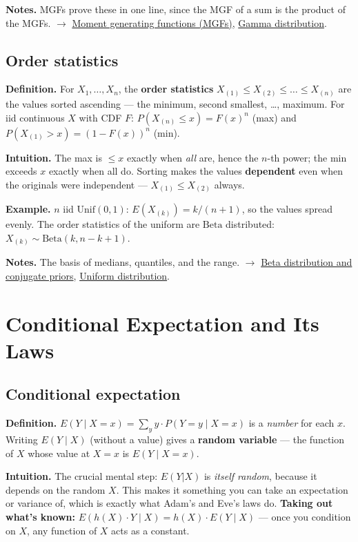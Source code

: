 \documentclass[11pt,a4paper]{article}
\begin{document}
\textbf{Notes.} MGFs prove these in one line, since the MGF of a sum is the product of the MGFs. $\to$ \hyperref[sec:moment-generating-functions-mgfs]{Moment generating functions (MGFs)}, \hyperref[sec:gamma-distribution]{Gamma distribution}.

\subsection{Order statistics}\label{sec:order-statistics}

\textbf{Definition.} For $X_{1}, \ldots , X_{n}$, the \textbf{order statistics} $X_{(1)} \leq  X_{(2)} \leq  \ldots  \leq  X_{(n)}$ are the values sorted ascending --- the minimum, second smallest, \ldots{}, maximum. For iid continuous $X$ with CDF $F$:
$P(X_{(n)} \leq  x) = F(x)^{n}$ (max) and $P(X_{(1)} > x) = (1 - F(x))^{n}$ (min).

\textbf{Intuition.} The max is $\leq  x$ exactly when \textit{all} are, hence the $n$-th power; the min exceeds $x$ exactly when all do. Sorting makes the values \textbf{dependent} even when the originals were independent --- $X_{(1)} \leq  X_{(2)}$ always.

\textbf{Example.} $n$ iid $\mathrm{Unif}(0,1)$: $E(X_{(k)}) = k/(n+1)$, so the values spread evenly. The order statistics of the uniform are $\mathrm{Beta}$ distributed: $X_{(k)} \sim \mathrm{Beta}(k, n-k+1)$.

\textbf{Notes.} The basis of medians, quantiles, and the range. $\to$ \hyperref[sec:beta-distribution-and-conjugate-priors]{Beta distribution and conjugate priors}, \hyperref[sec:uniform-distribution]{Uniform distribution}.


\section{Conditional Expectation and Its Laws}

\subsection{Conditional expectation}\label{sec:conditional-expectation}

\textbf{Definition.} $E(Y \mid X = x) = \sum _y y\cdot P(Y = y \mid X = x)$ is a \textit{number} for each $x$. Writing $E(Y \mid X)$ (without a value) gives a \textbf{random variable} --- the function of $X$ whose value at $X = x$ is $E(Y \mid X = x)$.

\textbf{Intuition.} The crucial mental step: $E(Y|X)$ is \textit{itself random}, because it depends on the random $X$. This makes it something you can take an expectation or variance of, which is exactly what Adam's and Eve's laws do. \textbf{Taking out what's known:} $E(h(X)\cdot Y \mid X) = h(X)\cdot E(Y \mid X)$ --- once you condition on $X$, any function of $X$ acts as a constant.
\end{document}
